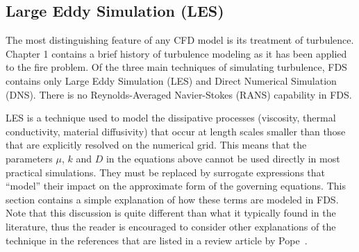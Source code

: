 \documentclass[11pt]{book}
\begin{document}
\subsection{Large Eddy Simulation (LES)}
\label{LES}

The most distinguishing feature of any CFD model is its treatment of turbulence.
Chapter 1 contains a brief history of turbulence modeling as it has been applied to the fire
problem. Of the three main techniques of simulating turbulence, FDS contains only Large Eddy
Simulation (LES) and Direct Numerical Simulation (DNS). There is no Reynolds-Averaged Navier-Stokes (RANS)
capability in FDS.

LES is a technique used to model the dissipative processes (viscosity,
thermal conductivity, material diffusivity) that occur at length scales smaller than those that
are explicitly resolved on the numerical grid. This means that the parameters $\mu$, $k$ and $D$ in the equations
above cannot be used directly in most practical simulations. They must be replaced by surrogate expressions
that ``model'' their impact on the approximate form of the governing equations.
This section contains a simple explanation of how these terms are modeled
in FDS. Note that this discussion is quite different than what it typically found in the
literature, thus the reader is encouraged to consider other explanations of the technique in the references that are
listed in a review article by Pope~\cite{Pope:LES}.
\end{document}
